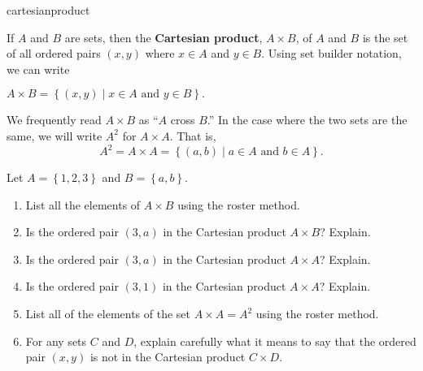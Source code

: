 %
\begin{previewactivity}\label{PA:cartesianproduct} \hfill

\begin{defbox}{cartesianproduct}{If  $A$  and  $B$  are sets, then the \textbf{Cartesian product},
%
 $A \times B$, of  $A$  and  $B$  is the set of all ordered pairs  $\left( {x,y} \right)$ where  $x \in A$ and  $y \in B$.  Using  set builder notation, we can write
\begin{center}
$A \times B = \left\{ { {\left( {x,y} \right)} \mid x \in A\text{ and }y \in B} \right\}.$
\end{center}
\label{sym:cartprod}
We frequently read  $A \times B$ as  ``$A$  cross  $B$.''
In the case where the two sets are the same, we will write  $A^2 $ for  $A \times A$.  That is,
\[
A^2  = A \times A = \left\{ {\left( {a,b} \right) \mid a \in A\text{ and }b \in A} \right\}.
\]}
\end{defbox}

Let $A = \left\{ {1,2,3} \right\}$ and  $B = \left\{ {a,b} \right\}$.

\begin{enumerate}
\item List all the elements of  $A \times B$ using the roster method.

\item Is the ordered pair  $\left( {3,a} \right)$ in the Cartesian product  $A \times B$?  Explain.

\item Is the ordered pair  $\left( {3,a} \right)$ in the Cartesian product $A \times A$?  Explain.

\item Is the ordered pair  $\left( {3,1} \right)$ in the Cartesian product  $A \times A$?  Explain.

\item List all of the elements of the set   $A \times A = A^2$ using the roster method.

\item For any sets  $C$  and  $D$, explain carefully what it means to say that the ordered pair  $\left( {x,y} \right)$ is not in the Cartesian product  $C \times D$.

\end{enumerate}
\end{previewactivity}
\hbreak
\endinput
